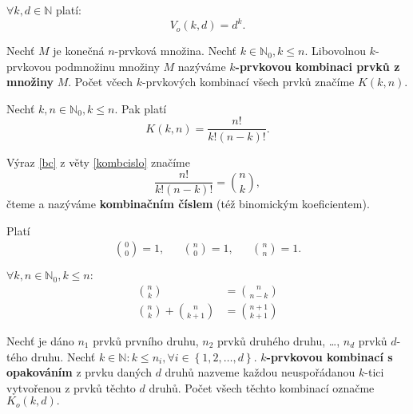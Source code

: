 \begin{veta}
    $\forall k, d \in \mathbb N$ platí:
    $$V_o(k,d)=d^k.$$
\end{veta}

\begin{definition}
    Nechť $M$ je konečná $n$-prvková množina. Nechť $k \in \mathbb N_0, k\leq n.$
    Libovolnou $k$-prvkovou podmnožinu množiny $M$ nazýváme \textbf{$k$-prvkovou
    kombinaci prvků z množiny} $M$. Počet včech $k$-prvkových kombinací všech
    prvků značíme $K(k,n).$
\end{definition}

\begin{veta}\label{kombcislo}
    Nechť $k,n \in \mathbb N_0, k\leq n.$ Pak platí
    \begin{equation}\label{bc}
   K(k,n)=\frac{n!}{k!(n-k)!}.
    \end{equation}

\end{veta}

\begin{definition}
    Výraz \ref{bc} z věty \ref{kombcislo} značíme
    $$\frac{n!}{k!(n-k)!}=\binom{n}{k},$$
    čteme  a nazýváme \textbf{kombinačním číslem} (též binomickým
    koeficientem).
\end{definition}

\begin{pozn}
    Platí
    \begin{align*}
        \binom{0}{0}=1, & & \binom{n}{0}=1, & & \binom{n}{n} = 1.
    \end{align*}
\end{pozn}

\begin{veta}\label{binomvztahy}
    $\forall k,n \in \mathbb N_0, k\leq n:$
    \begin{align*}
        \binom{n}{k} &= \binom{n}{n-k} \\
        \binom{n}{k} + \binom{n}{k+1} &= \binom{n+1}{k+1}
    \end{align*}
\end{veta}

\begin{definition}
    Nechť je dáno $n_1$ prvků prvního druhu, $n_2$ prvků druhého druhu, \dots,
    $n_d$ prvků $d$-tého druhu. Nechť $k\in \mathbb N: k\leq n_i, \forall i
    \in \left \{ 1,2,\dots,d \right \}$. \textbf{$k$-prvkovou kombinací s opakováním}
    z prvku daných $d$ druhů nazveme každou neuspořádanou $k$-tici vytvořenou z
    prvků těchto $d$ druhů. Počet všech těchto kombinací označme $K_o(k,d).$
\end{definition}

